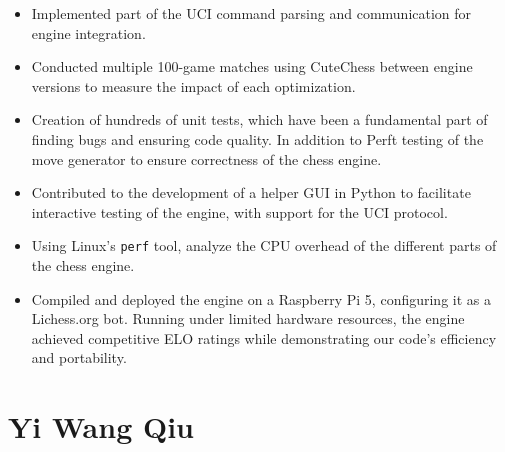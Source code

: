 \begin{itemize}
    \item Implemented part of the UCI command parsing and communication for engine integration.

    \item Conducted multiple 100-game matches using CuteChess between engine versions to measure the impact of each optimization.

    \item Creation of hundreds of unit tests, which have been a fundamental part of finding bugs and ensuring code quality. In addition to Perft testing of the move generator to ensure correctness of the chess engine.

    \item Contributed to the development of a helper GUI in Python to facilitate interactive testing of the engine, with support for the UCI protocol.    

    \item Using Linux's \texttt{perf} tool, analyze the CPU overhead of the different parts of the chess engine.

    \item Compiled and deployed the engine on a Raspberry Pi 5, configuring it as a Lichess.org bot.  Running under limited hardware resources, the engine achieved competitive ELO ratings while demonstrating our code's efficiency and portability.

\end{itemize}

\section*{Yi Wang Qiu}

